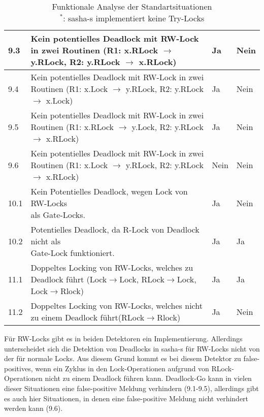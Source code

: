 \begin{table}[H]
\begin{tabular}{|l|l|l|l|}
    9.3 & \makecell[l]{Kein potentielles Deadlock mit RW-Lock in zwei Routinen\\(R1: x.RLock $\to$ y.RLock, R2: y.RLock $\to$ x.RLock)} & Ja & Nein \\ \hline
    9.4 & \makecell[l]{Kein potentielles Deadlock mit RW-Lock in zwei Routinen\\(R1: x.Lock $\to$ y.RLock, R2: y.RLock $\to$ x.Lock)} & Ja & Nein \\ \hline
    9.5 & \makecell[l]{Kein potentielles Deadlock mit RW-Lock in zwei Routinen\\(R1: x.RLock $\to$ y.Lock, R2: y.RLock $\to$ x.RLock)} & Ja & Nein \\ \hline
    9.6 & \makecell[l]{Kein potentielles Deadlock mit RW-Lock in zwei Routinen\\(R1: x.Lock $\to$ y.RLock, R2: y.RLock $\to$ x.RLock)} & Nein & Nein \\ \hline
    10.1 & \makecell[l]{Kein Potentielles Deadlock, wegen Lock von RW-Locks\\als Gate-Locks.} & Ja & Nein \\ \hline
    10.2 & \makecell[l]{Potentielles Deadlock, da R-Lock von Deadlock nicht als\\Gate-Lock funktioniert.} & Ja & Ja \\ \hline
    11.1 & \makecell[l]{Doppeltes Locking von RW-Locks, welches zu Deadlock führt\\(Lock$\to$Lock, RLock$\to$Lock, Lock$\to$Rlock)} & Ja & Ja \\ \hline
    11.2 & \makecell[l]{Doppeltes Locking von RW-Locks, welches nicht zu einem\\Deadlock führt(RLock$\to$Rlock)} & Ja & Nein \\ \hline
\end{tabular}
\caption{Funktionale Analyse der Standartsituationen\\$^*$: sasha-s implementiert keine Try-Locks}
\label{Tab::Analyse:Functional.Standart}
\end{table}
Für RW-Locks gibt es in beiden Detektoren ein Implementierung. Allerdings unterscheidet
sich die Detektion von Deadlocks in sasha-s für RW-Locks nicht von der für 
normale Locks. Aus diesem Grund kommt es bei diesem Detektor zu false-positives,
wenn ein Zyklus in den Lock-Operationen aufgrund von RLock-Operationen nicht 
zu einem Deadlock führen kann. Deadlock-Go kann in vielen dieser Situationen 
eine false-positive Meldung verhindern (9.1-9.5), allerdings gibt es auch hier 
Situationen, in denen eine false-positive Meldung nicht verhindert werden kann (9.6).\\
